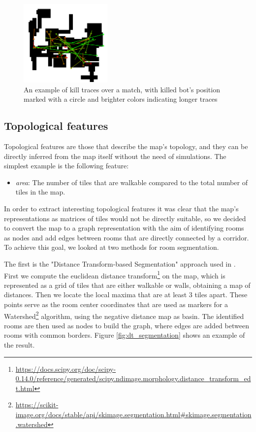 \documentclass{Configuration_Files/PoliMi3i_thesis}
\begin{document}
\begin{figure}[hbt!]
\label{fig:kill_traces_example}
    \centering
    \includegraphics[width=0.4\textwidth]{images/Traces_Example.png}
    \caption[Kill traces example]{An example of kill traces over a match, with killed bot's position marked with a circle and brighter colors indicating longer traces}
\end{figure}

\subsection{Topological features}
\label{subsec:topological_features}
Topological features are those that describe the map's topology, and they can be directly inferred from the map itself without the need of simulations. The simplest example is the following feature: 

\begin{itemize}
    \item \textit{area}: The number of tiles that are walkable compared to the total number of tiles in the map.
\end{itemize}

In order to extract interesting topological features it was clear that the map's representations as matrices of tiles would not be directly suitable, so we decided to convert the map to a graph representation with the aim of identifying rooms as nodes and add edges between rooms that are directly connected by a corridor. To achieve this goal, we looked at two methods for room segmentation. 

The first is the "Distance Transform-based Segmentation" approach used in \citep{bormann_room_2016}. First we compute the euclidean distance transform\footnote{\raggedright\url{https://docs.scipy.org/doc/scipy-0.14.0/reference/generated/scipy.ndimage.morphology.distance_transform_edt.html}} on the map, which is represented as a grid of tiles that are either walkable or walls, obtaining a map of distances. Then we locate the local maxima that are at least 3 tiles apart. These points serve as the room center coordinates that are used as markers for a Watershed\footnote{\raggedright\url{https://scikit-image.org/docs/stable/api/skimage.segmentation.html\#skimage.segmentation.watershed}} algorithm, using the negative distance map as basin. The identified rooms are then used as nodes to build the graph, where edges are added between rooms with common borders. Figure \ref{fig:dt_segmentation} shows an example of the result.
\end{document}
